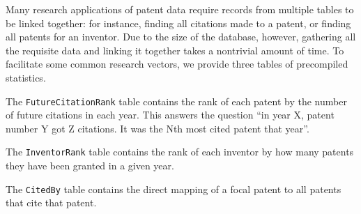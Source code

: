 Many research applications of patent data require records from multiple tables
to be linked together: for instance, finding all citations made to a patent, or
finding all patents for an inventor. Due to the size of the database, however,
gathering all the requisite data and linking it together takes a nontrivial
amount of time. To facilitate some common research vectors, we provide three
tables of precompiled statistics.

The \verb`FutureCitationRank` table contains the rank of each patent by the number of future citations
in each year. This answers the question ``in year X, patent number Y got Z
citations. It was the Nth most cited patent that year''.

The \verb`InventorRank` table contains the rank of each inventor by how many
patents they have been granted in a given year.

The \verb`CitedBy` table contains the direct mapping of a focal patent to all
patents that cite that patent.
